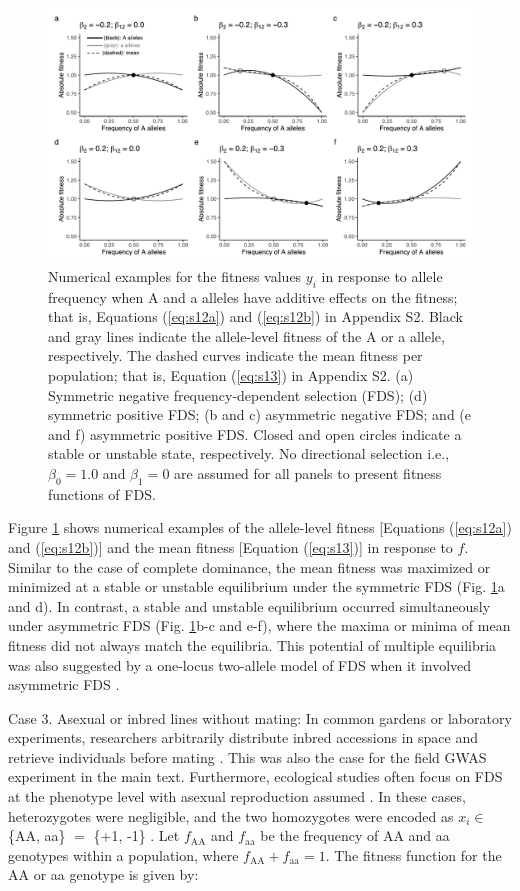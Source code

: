 \documentclass[12pt,]{article}
\begin{document}
\begin{figure}[ht]
  \includegraphics[width=0.95\linewidth]{AsymFDSadd.pdf}
  \caption{Numerical examples for the fitness values $y_i$ in response to allele frequency when A and a alleles have additive effects on the fitness; that is, Equations (\ref{eq:s12a}) and (\ref{eq:s12b}) in Appendix S2. Black and gray lines indicate the allele-level fitness of the A or a allele, respectively. The dashed curves indicate the mean fitness per population; that is, Equation (\ref{eq:s13}) in Appendix S2. (a) Symmetric negative frequency-dependent selection (FDS); (d) symmetric positive FDS; (b and c) asymmetric negative FDS; and (e and f) asymmetric positive FDS. Closed and open circles indicate a stable or unstable state, respectively. No directional selection i.e., $\beta_0=1.0$ and $\beta_1=0$ are assumed for all panels to present fitness functions of FDS.}
  \label{figS2:FDSadd}
\end{figure}

Figure \ref{figS2:FDSadd} shows numerical examples of the allele-level fitness [Equations (\ref{eq:s12a}) and (\ref{eq:s12b})] and the mean fitness [Equation (\ref{eq:s13})] in response to $f$. Similar to the case of complete dominance, the mean fitness was maximized or minimized at a stable or unstable equilibrium under the symmetric FDS (Fig. \ref{figS2:FDSadd}a and d). In contrast, a stable and unstable equilibrium occurred simultaneously under asymmetric FDS (Fig. \ref{figS2:FDSadd}b-c and e-f), where the maxima or minima of mean fitness did not always match the equilibria. This potential of multiple equilibria was also suggested by a one-locus two-allele model of FDS when it involved asymmetric FDS \citep{schneider_maximization_2008}. 

Case 3. Asexual or inbred lines without mating: In common gardens or laboratory experiments, researchers arbitrarily distribute inbred accessions in space and retrieve individuals before mating \citep[e.g.,][]{sato2019neighbor}. This was also the case for the field GWAS experiment in the main text. Furthermore, ecological studies often focus on FDS at the phenotype level with asexual reproduction assumed \citep[e.g.,][]{takahashi2018balanced}. In these cases, heterozygotes were negligible, and the two homozygotes were encoded as $x_i \in $ \{AA, aa\} $=$ \{+1, -1\} \citep{sato2019neighbor}. Let $f_\mathrm{AA}$ and $f_\mathrm{aa}$ be the frequency of AA and aa genotypes within a population, where $f_\mathrm{AA} + f_\mathrm{aa} = 1$. The fitness function for the AA or aa genotype is given by:
\end{document}
